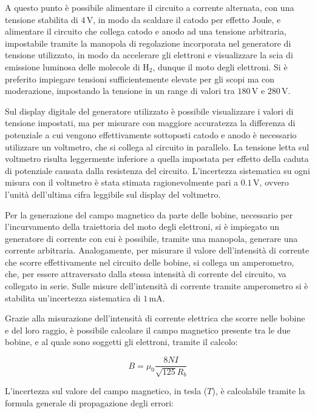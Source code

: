 \documentclass[a4paper,12pt]{article}
\begin{document}
A questo punto è possibile alimentare il circuito a corrente alternata, con una tensione stabilita di \( 4 \, \text{V} \), in modo da scaldare il catodo per effetto Joule, e alimentare il circuito che collega catodo e anodo ad una tensione arbitraria, impostabile tramite la manopola di regolazione incorporata nel generatore di tensione utilizzato, in modo da accelerare gli elettroni e visualizzare la scia di emissione luminosa delle molecole di \( \text{H}_2 \), dunque il moto degli elettroni. Si è preferito impiegare tensioni sufficientemente elevate per gli scopi ma con moderazione, impostando la tensione in un range di valori tra \( 180 \, \text{V} \) e \( 280 \, \text{V} \).

Sul display digitale del generatore utilizzato è possibile visualizzare i valori di tensione impostati, ma per misurare con maggiore accuratezza la differenza di potenziale a cui vengono effettivamente sottoposti catodo e anodo è necessario utilizzare un voltmetro, che si collega al circuito in parallelo. La tensione letta sul voltmetro risulta leggermente inferiore a quella impostata per effetto della caduta di potenziale causata dalla resistenza del circuito. L’incertezza sistematica su ogni misura con il voltmetro è stata stimata ragionevolmente pari a \( 0.1 \, \text{V} \), ovvero l’unità dell’ultima cifra leggibile sul display del voltmetro.

Per la generazione del campo magnetico da parte delle bobine, necessario per l’incurvamento della traiettoria del moto degli elettroni, si è impiegato un generatore di corrente con cui è possibile, tramite una manopola, generare una corrente arbitraria. Analogamente, per misurare il valore dell’intensità di corrente che scorre effettivamente nel circuito delle bobine, si collega un amperometro, che, per essere attraversato dalla stessa intensità di corrente del circuito, va collegato in serie. Sulle misure dell’intensità di corrente tramite amperometro si è stabilita un’incertezza sistematica di \( 1 \, \text{mA} \).

Grazie alla misurazione dell’intensità di corrente elettrica che scorre nelle bobine e del loro raggio, è possibile calcolare il campo magnetico presente tra le due bobine, e al quale sono soggetti gli elettroni, tramite il calcolo:

\begin{equation}
    B = \mu_0 \frac{8 N I}{\sqrt{125} R_b}
    \label{eq:campo_magnetico_bobine}
\end{equation}

L’incertezza sul valore del campo magnetico, in tesla (\( T \)), è calcolabile tramite la formula generale di propagazione degli errori:
\end{document}
